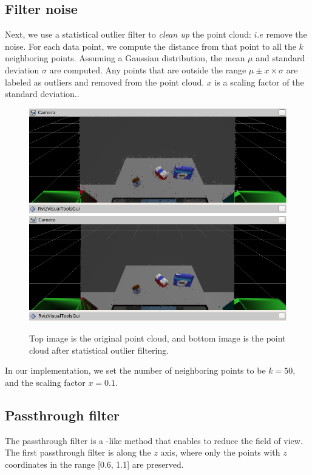 \documentclass[a4paper,12pt]{report}
\begin{document}
\subsection{Filter noise}
Next, we use a statistical outlier filter to \textit{clean up} the point cloud: $i.e$  remove the noise. For each data point, we compute the distance from that point to all the $k$ neighboring points. Assuming a Gaussian distribution, the mean $\mu$ and standard deviation $\sigma$ are computed. Any points that are outside the range $\mu \pm x \times \sigma$ are labeled as outliers and removed from the point cloud. $x$ is a scaling factor of the standard deviation..

\begin{figure}[H]
\centering
        \includegraphics[totalheight=4cm]{imgs/p_original.png}
        \includegraphics[totalheight=4cm]{imgs/p_remove_noise.png}
        \caption{Top image is the original point cloud, and bottom image is the point cloud after statistical outlier filtering.}
\end{figure}

In our implementation, we set the number of neighboring points to be $k=50$, and the scaling factor $x=0.1$.

\linespread{1.3}


\subsection{Passthrough filter}
The passthrough filter is a -like method that enables to reduce the field of view. The first passthrough filter is along the $z$ axis, where only the points with $z$ coordinates in the range [0.6, 1.1] are preserved.
\newline
\end{document}
